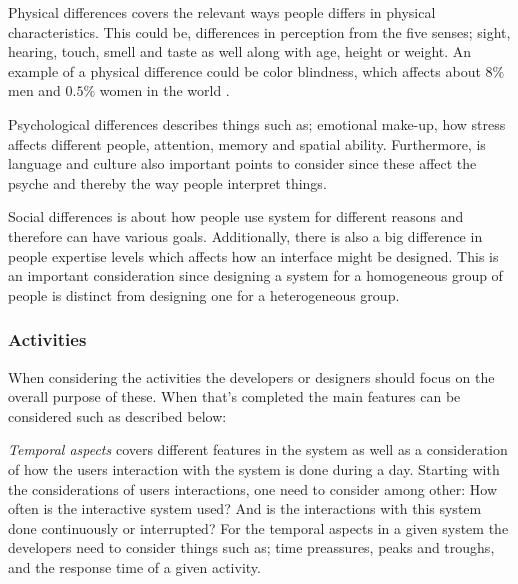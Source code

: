 Physical differences covers the relevant ways people differs in physical characteristics.
This could be, differences in perception from the five senses; sight, hearing, touch, smell and taste as well along with age, height or weight. An example of a physical difference could be color blindness, which affects about $8\%$ men and $0.5\%$ women in the world \cite{ColourBlind}.

Psychological differences describes things such as; emotional make-up, how stress affects different people, attention, memory and spatial ability.
Furthermore, is language and culture also important points to consider since these affect the psyche and thereby the way people interpret things.

Social differences is about how people use system for different reasons and therefore can have various goals. 
Additionally, there is also a big difference in people expertise levels which affects how an interface might be designed.
This is an important consideration since designing a system for a homogeneous group of people is  distinct from designing one for a heterogeneous group.

\subsubsection{Activities}
When considering the activities the developers or designers should focus on the overall purpose of these. When that's completed the main features can be considered such as described below:

\textit{Temporal aspects} covers different features in the system as well as a consideration of how the users interaction with the system is done during a day.
Starting with the considerations of users interactions, one need to consider among other: How often is the interactive system used? And is the interactions with this system done continuously or interrupted?
For the temporal aspects in a given system the developers need to consider things such as; time preassures, peaks and troughs, and the response time of a given activity.



